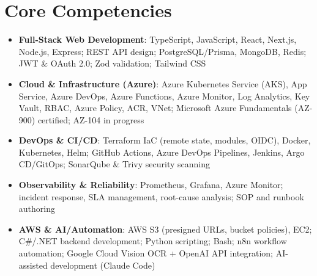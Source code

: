 \documentclass[11pt,a4paper,sans]{moderncv}
\begin{document}

\section{Core Competencies}
\vspace{1pt}
\begin{itemize}

\item \textbf{Full-Stack Web Development}: TypeScript, JavaScript, React, Next.js, Node.js, Express; REST API design; PostgreSQL/Prisma, MongoDB, Redis; JWT \& OAuth 2.0; Zod validation; Tailwind CSS

\item \textbf{Cloud \& Infrastructure (Azure)}: Azure Kubernetes Service (AKS), App Service, Azure DevOps, Azure Functions, Azure Monitor, Log Analytics, Key Vault, RBAC, Azure Policy, ACR, VNet; Microsoft Azure Fundamentals (AZ-900) certified; AZ-104 in progress

\item \textbf{DevOps \& CI/CD}: Terraform IaC (remote state, modules, OIDC), Docker, Kubernetes, Helm; GitHub Actions, Azure DevOps Pipelines, Jenkins, Argo CD/GitOps; SonarQube \& Trivy security scanning

\item \textbf{Observability \& Reliability}: Prometheus, Grafana, Azure Monitor; incident response, SLA management, root-cause analysis; SOP and runbook authoring

\item \textbf{AWS \& AI/Automation}: AWS S3 (presigned URLs, bucket policies), EC2; C\#/.NET backend development; Python scripting; Bash; n8n workflow automation; Google Cloud Vision OCR + OpenAI API integration; AI-assisted development (Claude Code)

\end{itemize}

\end{document}
